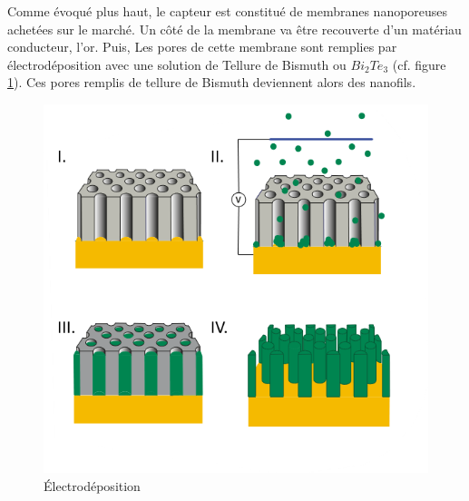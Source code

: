 Comme évoqué plus haut, le capteur est constitué de membranes nanoporeuses achetées sur le marché. 
Un côté de la membrane va être recouverte d'un matériau conducteur, l'or. Puis, Les pores de cette membrane sont remplies par 
électrodéposition avec une solution de Tellure de Bismuth ou $Bi_2Te_3$ (cf. figure \ref{fig:electrodeposition}). Ces pores remplis de tellure de 
Bismuth deviennent alors des nanofils. 
\begin{figure}[H]
    \centering
    \includegraphics[scale = 0.5]{images/Electrodeposition.png}
    \caption{Électrodéposition \cite{ruiz-gomez_electrodeposition_2022}}
    \label{fig:electrodeposition}
\end{figure}

